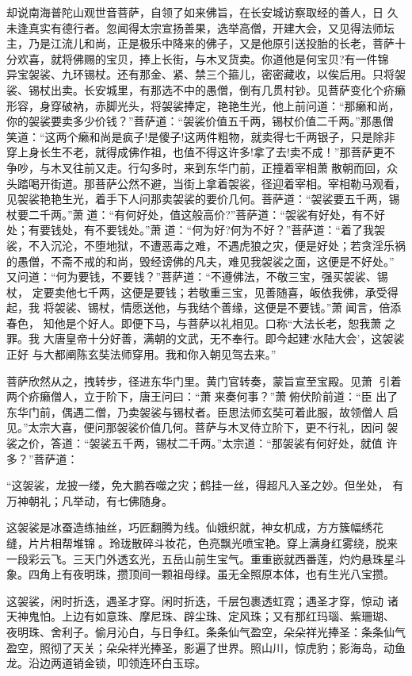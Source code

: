 却说南海普陀山观世音菩萨，自领了如来佛旨，在长安城访察取经的善人，日
久未逢真实有德行者。忽闻得太宗宣扬善果，选举高僧，开建大会，又见得法师坛
主，乃是江流儿和尚，正是极乐中降来的佛子，又是他原引送投胎的长老，菩萨十
分欢喜，就将佛赐的宝贝，捧上长街，与木叉货卖。你道他是何宝贝?有一件锦
异宝袈裟、九环锡杖。还有那金、紧、禁三个箍儿，密密藏收，以俟后用。只将袈
裟、锡杖出卖。长安城里，有那选不中的愚僧，倒有几贯村钞。见菩萨变化个疥癞
形容，身穿破衲，赤脚光头，将袈裟捧定，艳艳生光，他上前问道：“那癞和尚，
你的袈裟要卖多少价钱？”菩萨道：“袈裟价值五千两，锡杖价值二千两。”那愚僧
笑道：“这两个癞和尚是疯子!是傻子!这两件粗物，就卖得七千两银子，只是除非
穿上身长生不老，就得成佛作祖，也值不得这许多!拿了去!卖不成！”那菩萨更不
争吵，与木叉往前又走。行勾多时，来到东华门前，正撞着宰相萧散朝而回，众
头踏喝开街道。那菩萨公然不避，当街上拿着袈裟，径迎着宰相。宰相勒马观看，
见袈裟艳艳生光，着手下人问那卖袈裟的要价几何。菩萨道：“袈裟要五千两，锡
杖要二千两。”萧道：“有何好处，值这般高价?”菩萨道：“袈裟有好处，有不好
处；有要钱处，有不要钱处。”萧道：“何为好?何为不好？”菩萨道：“着了我袈
裟，不入沉沦，不堕地狱，不遭恶毒之难，不遇虎狼之灾，便是好处；若贪淫乐祸
的愚僧，不斋不戒的和尚，毁经谤佛的凡夫，难见我袈裟之面，这便是不好处。”
又问道：“何为要钱，不要钱？”菩萨道：“不遵佛法，不敬三宝，强买袈裟、锡杖，
定要卖他七千两，这便是要钱；若敬重三宝，见善随喜，皈依我佛，承受得起，我
将袈裟、锡杖，情愿送他，与我结个善缘，这便是不要钱。”萧闻言，倍添春色，
知他是个好人。即便下马，与菩萨以礼相见。口称“大法长老，恕我萧之罪。我
大唐皇帝十分好善，满朝的文武，无不奉行。即今起建‘水陆大会’，这袈裟正好
与大都阐陈玄奘法师穿用。我和你入朝见驾去来。”

菩萨欣然从之，拽转步，径进东华门里。黄门官转奏，蒙旨宣至宝殿。见萧
引着两个疥癞僧人，立于阶下，唐王问曰：“萧来奏何事？”萧俯伏阶前道：“臣
出了东华门前，偶遇二僧，乃卖袈裟与锡杖者。臣思法师玄奘可着此服，故领僧人
启见。”太宗大喜，便问那袈裟价值几何。菩萨与木叉侍立阶下，更不行礼，因问
袈裟之价，答道：“袈裟五千两，锡杖二千两。”太宗道：“那袈裟有何好处，就值
许多？”菩萨道：

“这袈裟，龙披一缕，免大鹏吞噬之灾；鹤挂一丝，得超凡入圣之妙。但坐处，
有万神朝礼；凡举动，有七佛随身。

这袈裟是冰蚕造练抽丝，巧匠翻腾为线。仙娥织就，神女机成，方方簇幅绣花
缝，片片相帮堆锦。玲珑散碎斗妆花，色亮飘光喷宝艳。穿上满身红雾绕，脱来
一段彩云飞。三天门外透玄光，五岳山前生宝气。重重嵌就西番莲，灼灼悬珠星斗
象。四角上有夜明珠，攒顶间一颗祖母绿。虽无全照原本体，也有生光八宝攒。

这袈裟，闲时折迭，遇圣才穿。闲时折迭，千层包裹透虹霓；遇圣才穿，惊动
诸天神鬼怕。上边有如意珠、摩尼珠、辟尘珠、定风珠；又有那红玛瑙、紫珊瑚、
夜明珠、舍利子。偷月沁白，与日争红。条条仙气盈空，朵朵祥光捧圣：条条仙气
盈空，照彻了天关；朵朵祥光捧圣，影遍了世界。照山川，惊虎豹；影海岛，动鱼
龙。沿边两道销金锁，叩领连环白玉琮。

